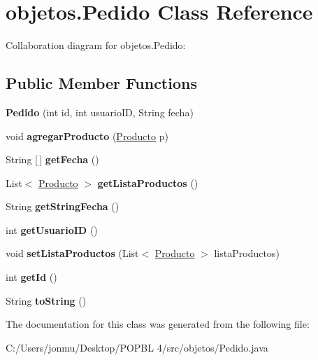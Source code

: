 \hypertarget{classobjetos_1_1_pedido}{}\section{objetos.\+Pedido Class Reference}
\label{classobjetos_1_1_pedido}


Collaboration diagram for objetos.\+Pedido\+:
\subsection*{Public Member Functions}
\begin{DoxyCompactItemize}
\item 
\mbox{\label{classobjetos_1_1_pedido_a2f4d8a34c054b61efca09e21891dc119}} 
{\bfseries Pedido} (int id, int usuario\+ID, String fecha)
\item 
\mbox{\label{classobjetos_1_1_pedido_ac1b1b41df8f346ef077017deccf269b5}} 
void {\bfseries agregar\+Producto} (\mbox{\hyperlink{classobjetos_1_1_producto}{Producto}} p)
\item 
\mbox{\label{classobjetos_1_1_pedido_ad9981fc190fd02fbf4f9c44811fc2102}} 
String \mbox{[}$\,$\mbox{]} {\bfseries get\+Fecha} ()
\item 
\mbox{\label{classobjetos_1_1_pedido_a9e4f2c0942939a0defdea21140e85e94}} 
List$<$ \mbox{\hyperlink{classobjetos_1_1_producto}{Producto}} $>$ {\bfseries get\+Lista\+Productos} ()
\item 
\mbox{\label{classobjetos_1_1_pedido_af2c6fe4c929f1fce6443e3ffcb2c0a45}} 
String {\bfseries get\+String\+Fecha} ()
\item 
\mbox{\label{classobjetos_1_1_pedido_afed5e1d427d944ead970861ef07be474}} 
int {\bfseries get\+Usuario\+ID} ()
\item 
\mbox{\label{classobjetos_1_1_pedido_a642984750b50555899811e39208729b4}} 
void {\bfseries set\+Lista\+Productos} (List$<$ \mbox{\hyperlink{classobjetos_1_1_producto}{Producto}} $>$ lista\+Productos)
\item 
\mbox{\label{classobjetos_1_1_pedido_a2cedae9fd179897d4d7e83b655d6fa58}} 
int {\bfseries get\+Id} ()
\item 
\mbox{\label{classobjetos_1_1_pedido_a2db5b46450987a7f2fb289e19cf593ac}} 
String {\bfseries to\+String} ()
\end{DoxyCompactItemize}


The documentation for this class was generated from the following file\+:\begin{DoxyCompactItemize}
\item 
C\+:/\+Users/jonmu/\+Desktop/\+P\+O\+P\+B\+L 4/src/objetos/Pedido.\+java\end{DoxyCompactItemize}
